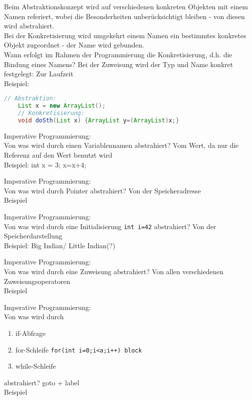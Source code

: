 \begin{card}
	Beim Abstraktionskonzept wird auf verschiedenen konkreten Objekten mit einem Namen referiert, wobei die Besonderheiten unberücksichtigt bleiben - von diesen wird abstrahiert.\\
	Bei der Konkretisierung wird umgekehrt einem Namen ein bestimmtes konkretes Objekt zugeordnet - der Name wird gebunden.\\
	Wann erfolgt im Rahmen der Programmierung die Konkretisierung, d.h. die Bindung	eines Namens?
	\hr
	Bei der Zuweisung wird der Typ und Name konkret festgelegt: Zur Laufzeit\\
	Beispiel:
	\begin{lstlisting}[language=Java]
	// Abstraktion:
	List x = new ArrayList();
	// Konkretisierung:
	void doSth(List x) {ArrayList y=(ArrayList)x;}
	\end{lstlisting}
\end{card}

\begin{card}
	Imperative Programmierung:\\
	Von was wird durch einen Variablennamen abstrahiert?
	\hr
	Vom Wert, da nur die Referenz auf den Wert benutzt wird\\
		Beispiel: int x = 3; x=x+4;
\end{card}

\begin{card}
	Imperative Programmierung:\\
	Von was wird durch Pointer abstrahiert?
	\hr
	Von der Speicheradresse\\
		Beispiel
\end{card}

\begin{card}
	Imperative Programmierung:\\
	Von was wird durch eine Initialisierung \texttt{int i=42} abstrahiert?
	\hr
	Von der Speicherdarstellung	\\
	Beispiel: Big Indian/ Little Indian(?)
\end{card}

\begin{card}
	Imperative Programmierung:\\
	Von was wird durch eine Zuweisung abstrahiert?
	\hr
	Von allen verschiedenen Zuweisungsoperatoren\\
		Beispiel
\end{card}

\begin{card}
	Imperative Programmierung:\\
	Von was wird durch 
	\begin{enumerate}
	\item if-Abfrage
	\item for-Schleife \texttt{for(int i=0;i<a;i++) block} 
	\item while-Schleife
	\end{enumerate}
	abstrahiert?
	\hr
	goto + label\\
	Beispiel
\end{card}

